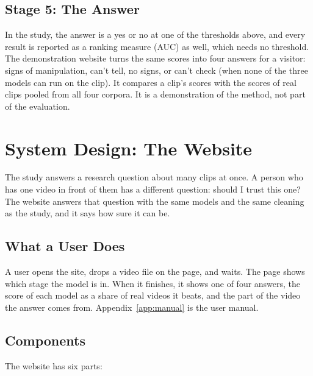 \subsection{Stage 5: The Answer}

In the study, the answer is a yes or no at one of the thresholds above, and
every result is reported as a ranking measure (AUC) as well, which needs no
threshold. The demonstration website turns the same scores into four answers for a
visitor: signs of manipulation, can't tell, no signs, or can't check (when none of the three models can run on the clip). It compares a
clip's scores with the scores of real clips pooled from all four corpora. It
is a demonstration of the method, not part of the evaluation.

\section{System Design: The Website}
\label{sec:m-website}

The study answers a research question about many clips at once. A person who
has one video in front of them has a different question: should I trust this
one? The website answers that question with the same models and the same
cleaning as the study, and it says how sure it can be.

\subsection{What a User Does}

A user opens the site, drops a video file on the page, and waits. The page
shows which stage the model is in. When it finishes, it shows one of four
answers, the score of each model as a share of real videos it beats, and the
part of the video the answer comes from. Appendix~\ref{app:manual} is the user
manual.

\subsection{Components}

The website has six parts:

